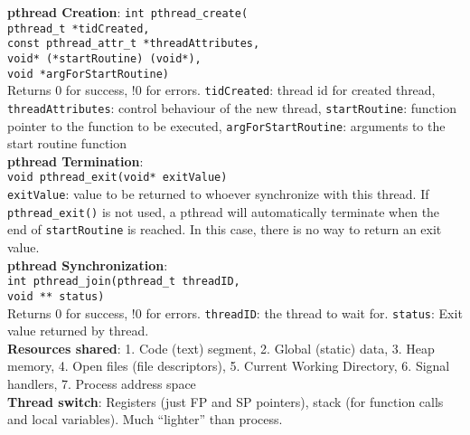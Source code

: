 \documentclass{article}
\begin{document}
\begin{multicols*}{3}
\textbf{pthread Creation}: \texttt{int pthread\_create(\\ pthread\_t *tidCreated, \\ const pthread\_attr\_t *threadAttributes, \\ void* (*startRoutine) (void*), \\ void *argForStartRoutine) } \\ Returns 0 for success, !0 for errors. \texttt{tidCreated}: thread id for created thread, \texttt{threadAttributes}: control behaviour of the new thread, \texttt{startRoutine}: function pointer to the function to be executed, \texttt{argForStartRoutine}: arguments to the start routine function  \\
\textbf{pthread Termination}: \\ \texttt{void pthread\_exit(void* exitValue)} \\ \texttt{exitValue}: value to be returned to whoever synchronize with this thread. If \texttt{pthread\_exit()} is not used, a pthread will automatically terminate when the end of \texttt{startRoutine} is reached. In this case, there is no way to return an exit value. \\
\textbf{pthread Synchronization}: \\ \texttt{int pthread\_join(pthread\_t threadID, \\ void ** status)} \\ Returns 0 for success, !0 for errors. \texttt{threadID}: the thread to wait for. \texttt{status}: Exit value returned by thread. \\
\textbf{Resources shared}: 1. Code (text) segment, 2. Global (static) data, 3. Heap memory, 4. Open files (file descriptors), 5. Current Working Directory, 6. Signal handlers, 7. Process address space \\ 
\textbf{Thread switch}: Registers (just FP and SP pointers), stack (for function calls and local variables). Much ``lighter'' than process.

\end{multicols*}
\end{document}
